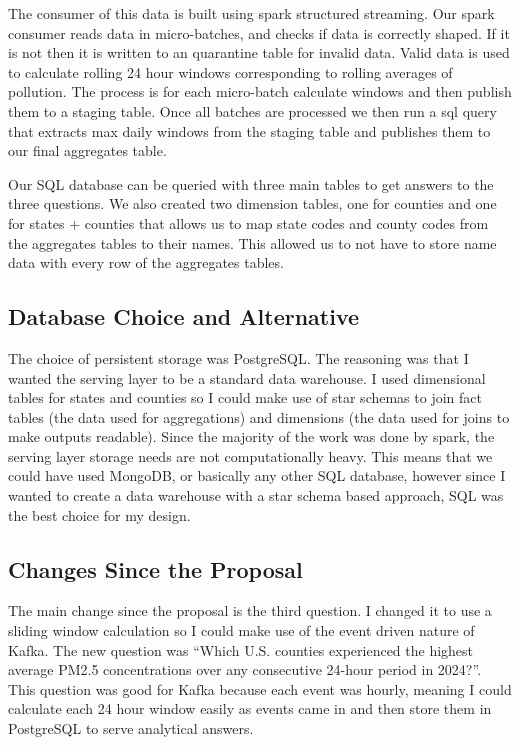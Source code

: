 \documentclass[11pt,letterpaper]{article}
\begin{document}
The consumer of this data is built using spark structured streaming. Our spark consumer reads data in micro-batches, and checks if data is correctly shaped. If it is not then it is written to an quarantine table for invalid data. Valid data is used to calculate rolling 24 hour windows corresponding to rolling averages of pollution. The process is for each micro-batch calculate windows and then publish them to a staging table. Once all batches are processed we then run a sql query that extracts max daily windows from the staging table and publishes them to our final aggregates table.

Our SQL database can be queried with three main tables to get answers to the three questions. We also created two dimension tables, one for counties and one for states + counties that allows us to map state codes and county codes from the aggregates tables to their names. This allowed us to not have to store name data with every row of the aggregates tables.


\subsection{Database Choice and Alternative}
The choice of persistent storage was PostgreSQL. The reasoning was that I wanted the serving layer to be a standard data warehouse. I used dimensional tables for states and counties so I could make use of star schemas to join fact tables (the data used for aggregations) and dimensions (the data used for joins to make outputs readable). Since the majority of the work was done by spark, the serving layer storage needs are not computationally heavy. This means that we could have used MongoDB, or basically any other SQL database, however since I wanted to create a data warehouse with a star schema based approach, SQL was the best choice for my design.

\subsection{Changes Since the Proposal}
The main change since the proposal is the third question. I changed it to use a sliding window calculation so I could make use of the event driven nature of Kafka. The new question was “Which U.S. counties experienced the highest average PM2.5 concentrations over any consecutive 24-hour period in 2024?”. This question was good for Kafka because each event was hourly, meaning I could calculate each 24 hour window easily as events came in and then store them in PostgreSQL to serve analytical answers.
\end{document}
